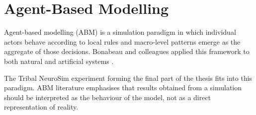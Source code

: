 \section{Agent-Based Modelling}

Agent-based modelling (ABM) is a simulation paradigm in which individual actors behave according to local rules and macro-level patterns emerge as the aggregate of those decisions. Bonabeau and colleagues applied this framework to both natural and artificial systems \cite{bonabeau2002}.

The Tribal NeuroSim experiment forming the final part of the thesis fits into this paradigm. ABM literature emphasises that results obtained from a simulation should be interpreted as the behaviour of the model, not as a direct representation of reality.
